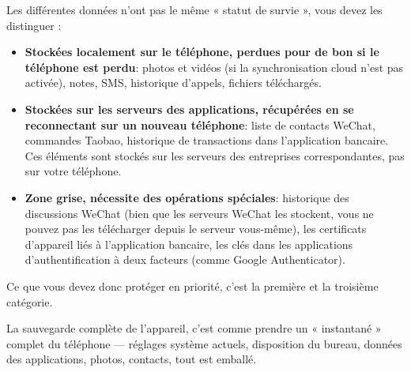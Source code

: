 


Les différentes données n'ont pas le même « statut de survie », vous devez les distinguer :

\begin{itemize}
  \item \textbf{Stockées localement sur le téléphone, perdues pour de bon si le téléphone est perdu}: photos et vidéos (si la synchronisation cloud n'est pas activée), notes, SMS, historique d'appels, fichiers téléchargés.
  \item \textbf{Stockées sur les serveurs des applications, récupérées en se reconnectant sur un nouveau téléphone}: liste de contacts WeChat, commandes Taobao, historique de transactions dans l'application bancaire. Ces éléments sont stockés sur les serveurs des entreprises correspondantes, pas sur votre téléphone.
  \item \textbf{Zone grise, nécessite des opérations spéciales}: historique des discussions WeChat (bien que les serveurs WeChat les stockent, vous ne pouvez pas les télécharger depuis le serveur vous-même), les certificats d'appareil liés à l'application bancaire, les clés dans les applications d'authentification à deux facteurs (comme Google Authenticator).
\end{itemize}

Ce que vous devez donc protéger en priorité, c'est la première et la troisième catégorie.


La sauvegarde complète de l'appareil, c'est comme prendre un « instantané » complet du téléphone — réglages système actuels, disposition du bureau, données des applications, photos, contacts, tout est emballé.



